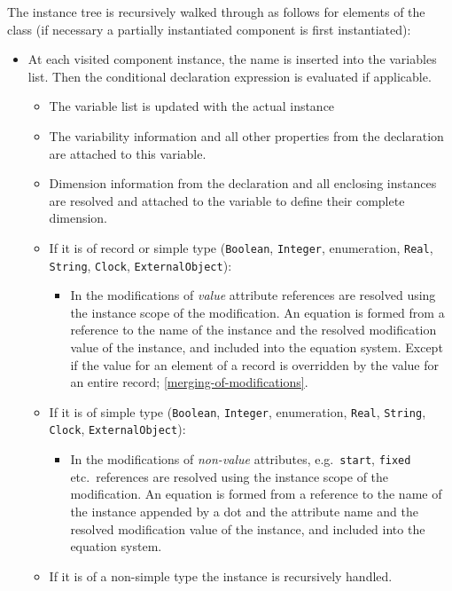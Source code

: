 The instance tree is recursively walked through as follows for elements of the class (if necessary a partially instantiated component is first instantiated):
\begin{itemize}
\item
  At each visited component instance, the name is inserted into the variables list.
  Then the conditional declaration expression is evaluated if applicable.
  \begin{itemize}
  \item
    The variable list is updated with the actual instance
  \item
    The variability information and all other properties from the declaration are attached to this variable.
  \item
    Dimension information from the declaration and all enclosing instances are resolved and attached to the variable to define their complete dimension.
  \item
    If it is of record or simple type (\lstinline!Boolean!, \lstinline!Integer!, enumeration, \lstinline!Real!, \lstinline!String!, \lstinline!Clock!, \lstinline!ExternalObject!):
    \begin{itemize}
    \item
      In the modifications of \emph{value} attribute references are resolved using the instance scope of the modification.
      An equation is formed from a reference to the name of the instance and the resolved modification value of the instance, and included into the equation system.
      Except if the value for an element of a record is overridden by the value for an entire record; \cref{merging-of-modifications}.
    \end{itemize}
  \item
    If it is of simple type (\lstinline!Boolean!, \lstinline!Integer!, enumeration, \lstinline!Real!, \lstinline!String!, \lstinline!Clock!, \lstinline!ExternalObject!):
    \begin{itemize}
    \item
      In the modifications of \emph{non-value} attributes, e.g.\ \lstinline!start!, \lstinline!fixed! etc.\ references are resolved using the instance scope of the modification.
      An equation is formed from a reference to the name of the instance appended by a dot and the attribute name and the resolved modification value of the instance, and included into the equation system.
    \end{itemize}
  \item
    If it is of a non-simple type the instance is recursively handled.

\end{itemize}
\end{itemize}
